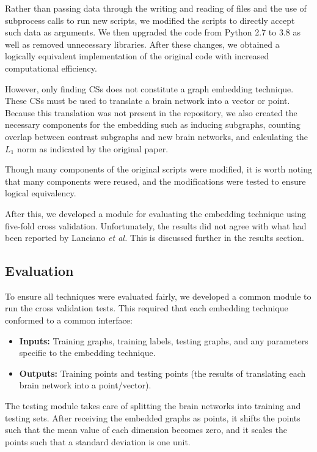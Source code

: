 \documentclass[sigconf]{acmart}
\begin{document}
Rather than passing data through the writing and reading of files and the use of subprocess calls to run new scripts, we modified the scripts to directly accept such data as arguments.
We then upgraded the code from Python 2.7 to 3.8 as well as removed unnecessary libraries.
After these changes, we obtained a logically equivalent implementation of the original code with increased computational efficiency.

However, only finding CSs does not constitute a graph embedding technique.
These CSs must be used to translate a brain network into a vector or point.
Because this translation was not present in the repository, we also created the necessary components for the embedding such as inducing subgraphs, counting overlap between contrast subgraphs and new brain networks, and calculating the $L_1$ norm as indicated by the original paper.

Though many components of the original scripts were modified, it is worth noting that many components were reused, and the modifications were tested to ensure logical equivalency.

After this, we developed a module for evaluating the embedding technique using five-fold cross validation.
Unfortunately, the results did not agree with what had been reported by Lanciano \emph{et al.}
This is discussed further in the results section.

\subsection{Evaluation} \label{evaluation}

To ensure all techniques were evaluated fairly, we developed a common module to run the cross validation tests.
This required that each embedding technique conformed to a common interface:

\begin{itemize}
    \item \textbf{Inputs:} Training graphs, training labels, testing graphs, and any parameters specific to the embedding technique.
    \item \textbf{Outputs:} Training points and testing points (the results of translating each brain network into a point/vector).
\end{itemize}

The testing module takes care of splitting the brain networks into training and testing sets.
After receiving the embedded graphs as points, it shifts the points such that the mean value of each dimension becomes zero, and it scales the points such that a standard deviation is one unit.
\end{document}
